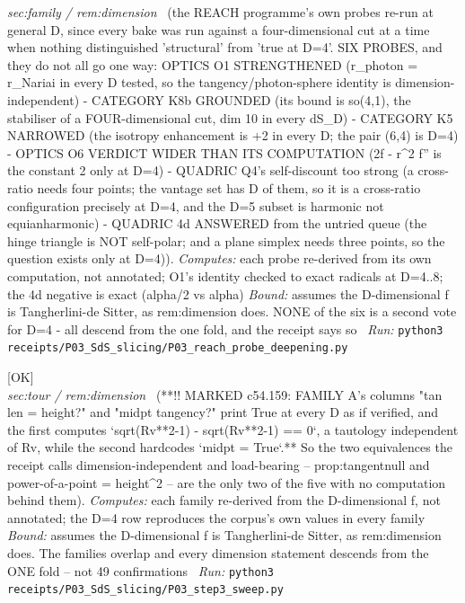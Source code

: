 \begin{description}
\textit{sec:family / rem:dimension} \ (the REACH programme's own probes re-run at general D, since every bake was run against a four-dimensional cut at a time when nothing distinguished 'structural' from 'true at D=4'. SIX PROBES, and they do not all go one way: OPTICS O1 STRENGTHENED (r\_photon = r\_Nariai in every D tested, so the tangency/photon-sphere identity is dimension-independent) - CATEGORY K8b GROUNDED (its bound is so(4,1), the stabiliser of a FOUR-dimensional cut, dim 10 in every dS\_D) - CATEGORY K5 NARROWED (the isotropy enhancement is +2 in every D; the pair (6,4) is D=4) - OPTICS O6 VERDICT WIDER THAN ITS COMPUTATION (2f - r\textasciicircum{}2 f'' is the constant 2 only at D=4) - QUADRIC Q4's self-discount too strong (a cross-ratio needs four points; the vantage set has D of them, so it is a cross-ratio configuration precisely at D=4, and the D=5 subset is harmonic not equianharmonic) - QUADRIC 4d ANSWERED from the untried queue (the hinge triangle is NOT self-polar; and a plane simplex needs three points, so the question exists only at D=4)). 
\emph{Computes:} each probe re-derived from its own computation, not annotated; O1's identity checked to exact radicals at D=4..8; the 4d negative is exact (alpha/2 vs alpha)
 \emph{Bound:} assumes the D-dimensional f is Tangherlini-de Sitter, as rem:dimension does. NONE of the six is a second vote for D=4 - all descend from the one fold, and the receipt says so
\ \emph{Run:} \texttt{python3 receipts/P03\_SdS\_slicing/P03\_reach\_probe\_deepening.py}
\item[\label{rcpt:P03_step3_sweep}\texttt{P03\_step3\_sweep}]\hfill\textsf{[OK]}\\
\textit{sec:tour / rem:dimension} \ (**!! MARKED c54.159: FAMILY A's columns "tan len = height?" and "midpt tangency?" print True at every D as if verified, and the first computes `sqrt(Rv**2-1) - sqrt(Rv**2-1) == 0`, a tautology independent of Rv, while the second hardcodes `midpt = True`.** So the two equivalences the receipt calls dimension-independent and load-bearing -- prop:tangentnull and power-of-a-point = height\textasciicircum{}2 -- are the only two of the five with no computation behind them). 
\emph{Computes:} each family re-derived from the D-dimensional f, not annotated; the D=4 row reproduces the corpus's own values in every family
 \emph{Bound:} assumes the D-dimensional f is Tangherlini-de Sitter, as rem:dimension does. The families overlap and every dimension statement descends from the ONE fold -- not 49 confirmations
\ \emph{Run:} \texttt{python3 receipts/P03\_SdS\_slicing/P03\_step3\_sweep.py}

\end{description}
